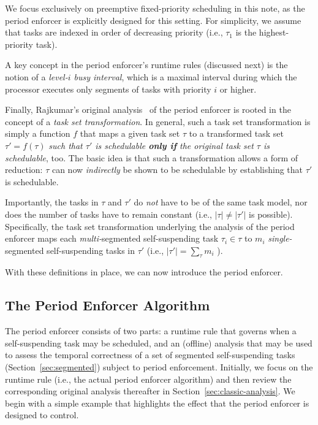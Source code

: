 We focus exclusively on preemptive fixed-priority scheduling in this note, as the period enforcer is explicitly designed for this setting. For simplicity, we assume that tasks are indexed in order of decreasing priority (i.e., $\tau_1$ is the highest-priority task). 

A key concept in the period enforcer's runtime rules (discussed next) is the notion of a \emph{level-$i$ busy interval}, which is a maximal interval during which  the processor executes only segments of tasks with priority $i$ or higher.

Finally, Rajkumar's original analysis~\cite{Raj:suspension1991} of the period enforcer is rooted in the concept of a \emph{task set transformation}. In general, such a task set transformation is simply a function $f$ that maps a given task set $\tau$ to a transformed task set $\tau' = f(\tau)$ \emph{such that $\tau'$ is schedulable \textbf{only if} the original task set $\tau$ is schedulable}, too. The basic idea is that such a transformation allows a form of reduction: $\tau$ can now \emph{indirectly} be shown to be schedulable by establishing that $\tau'$ is schedulable.

Importantly, the tasks in $\tau$ and $\tau'$ do \emph{not} have to be of the same task model, nor does the number of tasks have to remain constant (i.e.,  $|\tau| \neq |\tau'|$ is possible). Specifically, the task set transformation underlying the analysis of the period enforcer maps each \emph{multi-}segmented self-suspending task $\tau_i \in \tau$  to $m_i$ \emph{single-}segmented self-suspending tasks in $\tau'$ (i.e., $|\tau'| = \sum_{\tau} m_i$ ).

With these definitions in place, we can now introduce the period enforcer. 



\subsection{The Period Enforcer Algorithm}
\label{sec:pe}

The period enforcer consists of two parts: a runtime rule that governs when a self-suspending task may be scheduled, and an (offline) analysis that may be used to assess the temporal correctness of a set of segmented self-suspending tasks (Section~\ref{sec:segmented}) subject to period enforcement. Initially, we focus on the runtime rule (i.e., the actual period enforcer algorithm) and then review the corresponding original analysis thereafter in Section~\ref{sec:classic-analysis}.  We begin with a simple example that highlights the effect that the period enforcer is designed to control.
 


